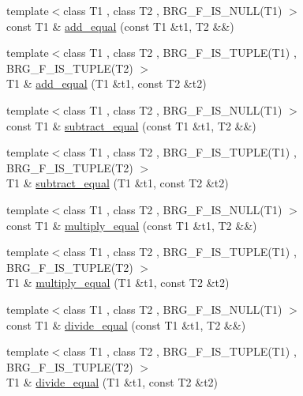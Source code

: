 \begin{DoxyCompactItemize}
{\footnotesize template$<$class T1 , class T2 , B\+R\+G\+\_\+\+F\+\_\+\+I\+S\+\_\+\+N\+U\+L\+L(\+T1) $>$ }\\const T1 \& \hyperlink{namespaceIceBRG_a06f5e1f4699ca69ee50e614fc314fc61}{add\+\_\+equal} (const T1 \&t1, T2 \&\&)
\item 
{\footnotesize template$<$class T1 , class T2 , B\+R\+G\+\_\+\+F\+\_\+\+I\+S\+\_\+\+T\+U\+P\+L\+E(\+T1) , B\+R\+G\+\_\+\+F\+\_\+\+I\+S\+\_\+\+T\+U\+P\+L\+E(\+T2) $>$ }\\T1 \& \hyperlink{namespaceIceBRG_abb979116386359a9542c9bca10712bc2}{add\+\_\+equal} (T1 \&t1, const T2 \&t2)
\item 
{\footnotesize template$<$class T1 , class T2 , B\+R\+G\+\_\+\+F\+\_\+\+I\+S\+\_\+\+N\+U\+L\+L(\+T1) $>$ }\\const T1 \& \hyperlink{namespaceIceBRG_aba433f0f1df8de11e5f738da8ef67d39}{subtract\+\_\+equal} (const T1 \&t1, T2 \&\&)
\item 
{\footnotesize template$<$class T1 , class T2 , B\+R\+G\+\_\+\+F\+\_\+\+I\+S\+\_\+\+T\+U\+P\+L\+E(\+T1) , B\+R\+G\+\_\+\+F\+\_\+\+I\+S\+\_\+\+T\+U\+P\+L\+E(\+T2) $>$ }\\T1 \& \hyperlink{namespaceIceBRG_aa00439fb1f98b5ab3fd4435a4ff85325}{subtract\+\_\+equal} (T1 \&t1, const T2 \&t2)
\item 
{\footnotesize template$<$class T1 , class T2 , B\+R\+G\+\_\+\+F\+\_\+\+I\+S\+\_\+\+N\+U\+L\+L(\+T1) $>$ }\\const T1 \& \hyperlink{namespaceIceBRG_a7a4405ff31b49e9215bd1ace7a8d1e9d}{multiply\+\_\+equal} (const T1 \&t1, T2 \&\&)
\item 
{\footnotesize template$<$class T1 , class T2 , B\+R\+G\+\_\+\+F\+\_\+\+I\+S\+\_\+\+T\+U\+P\+L\+E(\+T1) , B\+R\+G\+\_\+\+F\+\_\+\+I\+S\+\_\+\+T\+U\+P\+L\+E(\+T2) $>$ }\\T1 \& \hyperlink{namespaceIceBRG_a8a9b9c18a8f33f1e7a11e3c5074ad657}{multiply\+\_\+equal} (T1 \&t1, const T2 \&t2)
\item 
{\footnotesize template$<$class T1 , class T2 , B\+R\+G\+\_\+\+F\+\_\+\+I\+S\+\_\+\+N\+U\+L\+L(\+T1) $>$ }\\const T1 \& \hyperlink{namespaceIceBRG_afa3822bbe4a1004507a161f17facc454}{divide\+\_\+equal} (const T1 \&t1, T2 \&\&)
\item 
{\footnotesize template$<$class T1 , class T2 , B\+R\+G\+\_\+\+F\+\_\+\+I\+S\+\_\+\+T\+U\+P\+L\+E(\+T1) , B\+R\+G\+\_\+\+F\+\_\+\+I\+S\+\_\+\+T\+U\+P\+L\+E(\+T2) $>$ }\\T1 \& \hyperlink{namespaceIceBRG_a5634c6e0abab0629573daa2c53f9101b}{divide\+\_\+equal} (T1 \&t1, const T2 \&t2)

\end{DoxyCompactItemize}
